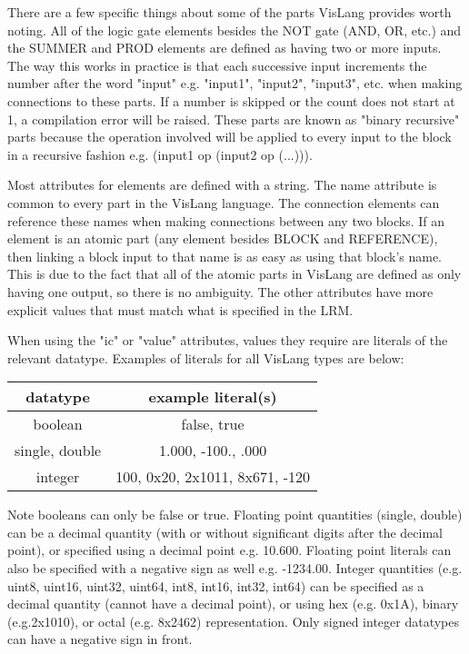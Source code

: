 There are a few specific things about some of the parts VisLang provides worth noting.
All of the logic gate elements besides the NOT gate (AND, OR, etc.) and the SUMMER and
PROD elements are defined as having two or more inputs. The way this works in practice
is that each successive input increments the number after the word "input" e.g. "input1",
"input2", "input3", etc. when making connections to these parts. If a number is skipped
or the count does not start at 1, a compilation error will be raised. These parts are
known as "binary recursive" parts because the operation involved will be applied to every
input to the block in a recursive fashion e.g. (input1 op (input2 op (...))).
\par
Most attributes for elements are defined with a string. The name attribute is common to
every part in the VisLang language. The connection elements can reference these names
when making connections between any two blocks. If an element is an atomic part (any
element besides BLOCK and REFERENCE), then linking a block input to that name is as easy
as using that block's name. This is due to the fact that all of the atomic parts in VisLang
are defined as only having one output, so there is no ambiguity. The other attributes have
more explicit values that must match what is specified in the LRM.
\par
When using the "ic" or "value" attributes, values they require are literals of the relevant
datatype. Examples of literals for all VisLang types are below:
\begin{longtable}[c]{ |c|c| } 
    \hline
    datatype & example literal(s) \\ 
    \hline\hline
    boolean & false, true \\
    single, double & 1.000, -100., .000 \\
    integer & 100, 0x20, 2x1011, 8x671, -120 \\ 
    \hline
\end{longtable}

Note booleans can only be false or true. Floating point quantities (single, double) can
be a decimal quantity (with or without significant digits after the decimal point),
or specified using a decimal point e.g. 10.600. Floating point literals can also be
specified with a negative sign as well e.g. -1234.00. Integer quantities (e.g.
uint8, uint16, uint32, uint64, int8, int16, int32, int64) can be specified as a
decimal quantity (cannot have a decimal point), or using hex (e.g. 0x1A), binary
(e.g.2x1010), or octal (e.g. 8x2462) representation. Only signed integer datatypes can
have a negative sign in front.

